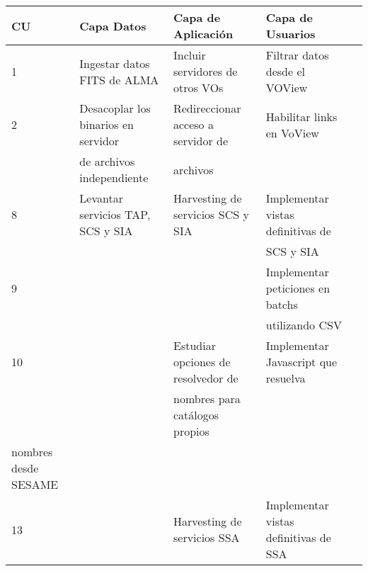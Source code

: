 \footnotesize
\begin{tabular}{|l|l|l|l|l|}
\hline
\footnotesize
\textbf{CU} & \textbf{Capa Datos} &
\textbf{Capa de Aplicación} & \textbf{Capa de Usuarios} \\
\hline
\hline
1 & 
Ingestar datos FITS de ALMA & 
Incluir servidores de otros VOs & 
Filtrar datos desde el VOView \\
\hline
2 & 
Desacoplar los binarios en servidor &
Redireccionar acceso a servidor de & 
Habilitar links en VoView \\
&
de archivos independiente &
archivos & \\
\hline
8 & 
Levantar servicios TAP, SCS y SIA & 
Harvesting de servicios SCS y SIA &
Implementar vistas definitivas de \\
& & &
SCS y SIA \\
\hline
9 & & & 
Implementar peticiones en batchs \\ 
& & & 
utilizando CSV \\
\hline
10 & & 
Estudiar opciones de resolvedor de &
Implementar Javascript que resuelva \\
& &
nombres para catálogos propios \\
nombres desde SESAME \\
\hline
13 & & 
Harvesting de servicios SSA &
Implementar vistas definitivas de SSA \\ 
\hline
\end{tabular}

\normalsize


